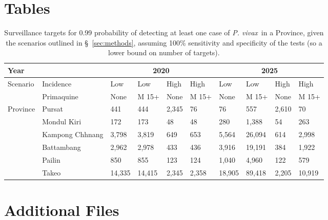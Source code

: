 \documentclass[doublespacing]{bmcart}
\newcommand{\pv}{\textit{P. vivax}}
\begin{document}
\begin{backmatter}

\section*{Tables}
\begin{table}[h!] 
\caption{Surveillance targets for 0.99 probability of detecting at least one case of \pv~in a Province, given the scenarios outlined in \S~\ref{sec:methods}, assuming 100\% sensitivity and specificity of the tests (so a lower bound on number of targets).}\label{tab:surveillance}
      \begin{tabular}{|l|l|l|l|l|l|l|l|l|l|}
       \hline 
       \multicolumn{2}{|l|}{Year} & \multicolumn{4}{|c|}{2020} & \multicolumn{4}{|c|}{2025} \\ \hline
       \multirow{2}{*}{Scenario} & Incidence & Low & Low & High & High & Low & Low & High & High \\ %
                                 & Primaquine & None & M 15+ & None & M 15+ & None & M 15+ & None & M 15+ \\ \hline
    \multirow{6}{*}{Province} & Pursat & 441 & 444 & 2,345 & 76 & 76 & 557 & 2,610 & 70 \\ %
                              & Mondul Kiri & 172 & 173 & 48 & 48 & 280 & 1,388 & 54 & 263 \\ %
                              & Kampong Chhnang & 3,798 & 3,819 & 649 & 653 & 5,564 & 26,094 & 614 & 2,998 \\ %
                              & Battambang & 2,962 & 2,978 & 433 & 436 & 3,916 & 19,191 & 384 & 1,922 \\ %
                              & Pailin & 850 & 855 & 123 & 124 & 1,040 & 4,960 & 122 & 579 \\ %
                              & Takeo & 14,335 & 14,415 & 2,345 & 2,358 & 18,905 & 89,418 & 2,205 & 10,919 \\ \hline 
      \end{tabular}
\end{table}


\section*{Additional Files}

\end{backmatter}
\end{document}
